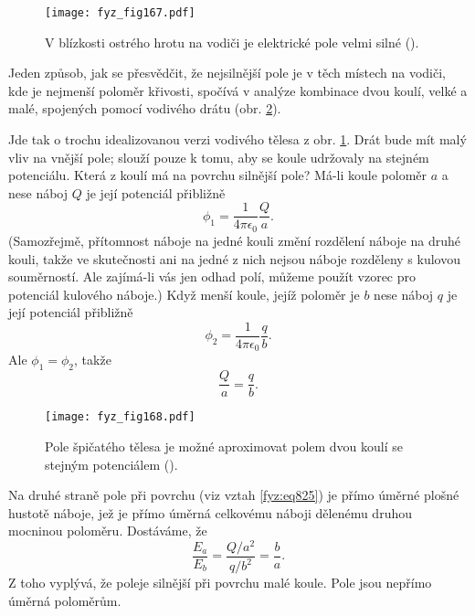   \begin{figure}[ht!]  %
    \centering
    \texttt{[image: fyz\_fig167.pdf]}
    \caption{V blízkosti ostrého hrotu na vodiči je elektrické pole velmi silné
             (\cite[s.~116]{Feynman02}).}
    \label{fyz:fig167}
  \end{figure}

  Jeden způsob, jak se přesvědčit, že nejsilnější pole je v těch místech na vodiči, kde je nejmenší
  poloměr křivosti, spočívá v analýze kombinace dvou koulí, velké a malé, spojených pomocí vodivého
  drátu (obr. \ref{fyz:fig168}).  

  Jde tak o trochu idealizovanou verzi vodivého tělesa z obr. \ref{fyz:fig167}. Drát bude mít malý
  vliv na vnější pole; slouží pouze k tomu, aby se koule udržovaly na stejném potenciálu. Která z
  koulí má na povrchu silnější pole? Má-li koule poloměr \(a\) a nese náboj \(Q\) je její potenciál
  přibližně
  \begin{equation*}
    ϕ_1=\dfrac{1}{4πϵ_0}\dfrac{Q}{a}.
  \end{equation*}
  (Samozřejmě, přítomnost náboje na jedné kouli změní rozdělení náboje na druhé kouli, takže 
  ve skutečnosti ani na jedné z nich nejsou náboje rozděleny s kulovou souměrností. Ale zajímá-li
  vás jen odhad polí, můžeme použít vzorec pro potenciál kulového náboje.) Když menší koule, jejíž
  poloměr je \(b\) nese náboj \(q\) je její potenciál přibližně
  \begin{equation*}
    ϕ_2=\dfrac{1}{4πϵ_0}\dfrac{q}{b}.
  \end{equation*}
  Ale \(ϕ_1=ϕ_2\), takže
  \begin{equation*}
    \dfrac{Q}{a}=\dfrac{q}{b}.
  \end{equation*}
    
  \begin{figure}[ht!]  %
    \centering
    \texttt{[image: fyz\_fig168.pdf]}
    \caption{Pole špičatého tělesa je možné aproximovat polem dvou koulí se stejným potenciálem
             (\cite[s.~116]{Feynman02}).}
    \label{fyz:fig168}
  \end{figure}

  Na druhé straně pole při povrchu (viz vztah \ref{fyz:eq825}) je přímo úměrné
  plošné hustotě náboje, jež je přímo úměrná celkovému náboji dělenému druhou mocninou poloměru.
  Dostáváme, že
  \begin{equation}\label{fyz:eq826}
    \dfrac{E_a}{E_b}=\dfrac{Q/a^2}{q/b^2}=\dfrac{b}{a}.
  \end{equation}
  Z toho vyplývá, že poleje silnější při povrchu malé koule. Pole jsou nepřímo úměrná poloměrům.

